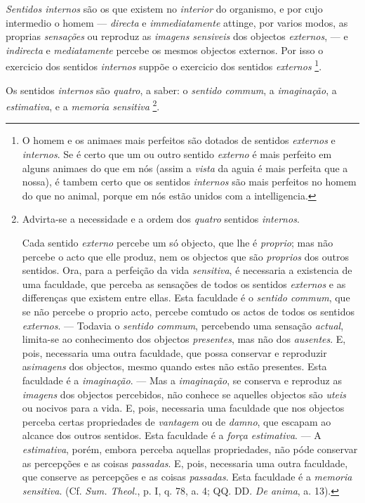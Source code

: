 \emph{Sentidos internos} são os que existem no \emph{interior} do organismo, e por cujo intermedio o homem --- \emph{directa} e \emph{immediatamente} attinge, por varios modos, as proprias \emph{sensações} ou reproduz as \emph{imagens sensiveis} dos objectos \emph{externos}, --- e \emph{indirecta} e \emph{mediatamente} percebe os mesmos objectos externos. Por isso o exercicio dos sentidos \emph{internos} suppõe o exercicio dos sentidos \emph{externos} \footnote{O homem e os animaes mais perfeitos são dotados de sentidos \emph{externos} e \emph{internos}. Se é certo que um ou outro sentido \emph{externo} é mais perfeito em alguns animaes do que em nós (assim a \emph{vista} da aguia é mais perfeita que a nossa), é tambem certo que os sentidos \emph{internos} são mais perfeitos no homem do que no animal, porque em nós estão unidos com a intelligencia.}.


Os sentidos \emph{internos} são \emph{quatro}, a saber: o \emph{sentido commum}, a \emph{imaginação}, a \emph{estimativa}, e a \emph{memoria sensitiva} \footnote{Advirta-se a necessidade e a ordem dos \emph{quatro} sentidos \emph{internos}.\par Cada sentido \emph{externo} percebe um só objecto, que lhe é \emph{proprio}; mas não percebe o acto que elle produz, nem os objectos que são \emph{proprios} dos outros sentidos. Ora, para a perfeição da vida \emph{sensitiva}, é necessaria a existencia de uma faculdade, que perceba as sensações de todos os sentidos \emph{externos} e as differenças que existem entre ellas. Esta faculdade é o \emph{sentido commum}, que se não percebe o proprio acto, percebe comtudo os actos de todos os sentidos \emph{externos}. --- Todavia o \emph{sentido commum}, percebendo uma sensação \emph{actual}, limita-se ao conhecimento dos objectos \emph{presentes}, mas não dos \emph{ausentes}. E, pois, necessaria uma outra faculdade, que possa conservar e reproduzir as\emph{imagens} dos objectos, mesmo quando estes não estão presentes. Esta faculdade é a \emph{imaginação}. --- Mas a \emph{imaginação}, se conserva e reproduz as \emph{imagens} dos objectos percebidos, não conhece se aquelles objectos são \emph{uteis} ou nocivos para a vida. E, pois, necessaria uma faculdade que nos objectos perceba certas propriedades de \emph{vantagem} ou de \emph{damno}, que escapam ao alcance dos outros sentidos. Esta faculdade é a \emph{força estimativa}. --- A \emph{estimativa}, porém, embora perceba aquellas propriedades, não póde conservar as percepções e as coisas \emph{passadas}. E, pois, necessaria uma outra faculdade, que conserve as percepções e as coisas \emph{passadas}. Esta faculdade é a \emph{memoria sensitiva}. (Cf. \emph{Sum. Theol.}, p. I, q. 78, a. 4; QQ. DD. \emph{De anima}, a. 13).}.

